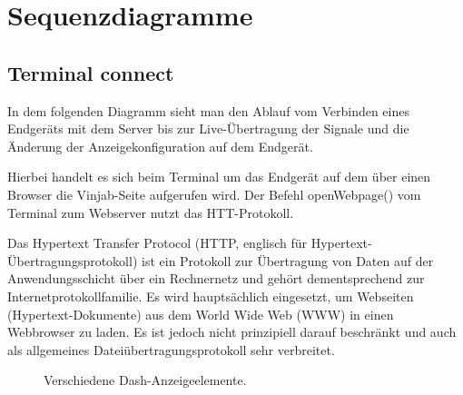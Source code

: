 \documentclass[entwurf.tex]{subfiles}
\begin{document}
\chapter{Sequenzdiagramme}
	\section{Terminal connect}
		In dem folgenden Diagramm sieht man den Ablauf vom Verbinden eines Endgeräts mit dem Server bis zur Live-Übertragung der Signale und die Änderung der Anzeigekonfiguration auf dem Endgerät. 
		
		Hierbei handelt es sich beim Terminal um das Endgerät auf dem über einen Browser die Vinjab-Seite aufgerufen wird. Der Befehl openWebpage() vom Terminal zum Webserver nutzt das HTT-Protokoll. 

		Das Hypertext Transfer Protocol (HTTP, englisch für Hypertext-Übertragungsprotokoll) ist ein Protokoll zur Übertragung von Daten auf der Anwendungsschicht über ein Rechnernetz und gehört dementsprechend zur Internetprotokollfamilie. Es wird hauptsächlich eingesetzt, um Webseiten (Hypertext-Dokumente) aus dem World Wide Web (WWW) in einen Webbrowser zu laden. Es ist jedoch nicht prinzipiell darauf beschränkt und auch als allgemeines Dateiübertragungsprotokoll sehr verbreitet. %
		
		\begin{figure}[H]
  			\caption{Verschiedene Dash-Anzeigeelemente.}
  		\end{figure}
  		
\end{document}
